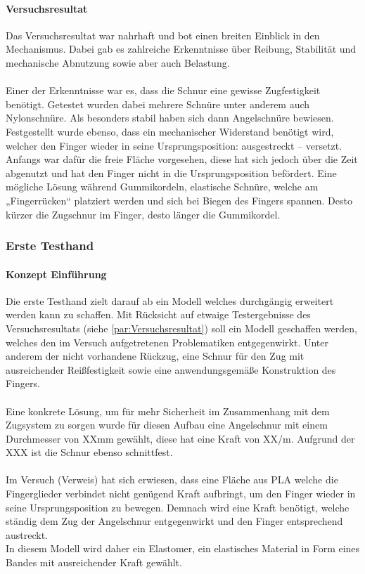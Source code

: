 \documentclass[titlepage,12pt,twoside]{article}
\begin{document}
\paragraph{Versuchsresultat}
\label{par:Versuchsresultat}
\hfill \break
\hfill \break
Das Versuchsresultat war nahrhaft und bot einen breiten Einblick in den Mechanismus. 
Dabei gab es zahlreiche Erkenntnisse über Reibung, Stabilität und mechanische Abnutzung 
sowie aber auch Belastung. \\
\\
Einer der Erkenntnisse war es, dass die Schnur eine gewisse Zugfestigkeit benötigt. 
Getestet wurden dabei mehrere Schnüre unter anderem auch Nylonschnüre. Als besonders 
stabil haben sich dann Angelschnüre bewiesen.
Festgestellt wurde ebenso, dass ein mechanischer Widerstand benötigt wird, welcher den 
Finger wieder in seine Ursprungsposition: ausgestreckt – versetzt. Anfangs war dafür 
die freie Fläche vorgesehen, diese hat sich jedoch über die Zeit abgenutzt und hat den 
Finger nicht in die Ursprungsposition befördert. Eine mögliche Lösung während 
Gummikordeln, elastische Schnüre, welche am „Fingerrücken“ platziert werden und sich 
bei Biegen des Fingers spannen. Desto kürzer die Zugschnur im Finger, desto länger die 
Gummikordel. \\

\subsubsection{Erste Testhand}
\label{chap:Erste Testhand}
\paragraph{Konzept Einführung}
\hfill \break
\hfill \break
Die erste Testhand zielt darauf ab ein Modell welches durchgängig erweitert 
werden kann zu schaffen. Mit Rücksicht auf etwaige Testergebnisse des 
Versuchsresultats (siehe \autoref{par:Versuchsresultat}) soll ein Modell geschaffen werden, 
welches den im Versuch aufgetretenen Problematiken entgegenwirkt. Unter anderem 
der nicht vorhandene Rückzug, eine Schnur für den Zug mit ausreichender 
Reißfestigkeit sowie eine anwendungsgemäße Konstruktion des Fingers. \\
\\
Eine konkrete Lösung, um für mehr Sicherheit im Zusammenhang mit dem Zugsystem 
zu sorgen wurde für diesen Aufbau eine Angelschnur mit einem Durchmesser von 
XXmm gewählt, diese hat eine Kraft von XX/m. Aufgrund der XXX ist die Schnur 
ebenso schnittfest. \\
\\
Im Versuch (Verweis) hat sich erwiesen, dass eine Fläche aus PLA welche die 
Fingerglieder verbindet nicht genügend Kraft aufbringt, um den Finger wieder in 
seine Ursprungsposition zu bewegen. Demnach wird eine Kraft benötigt, welche 
ständig dem Zug der Angelschnur entgegenwirkt und den Finger entsprechend 
austreckt. \\
In diesem Modell wird daher ein Elastomer, ein elastisches Material in Form 
eines Bandes mit ausreichender Kraft gewählt. \\
\end{document}
